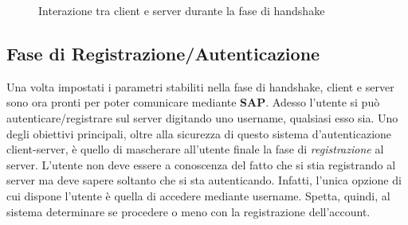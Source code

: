 \begin{figure}[!ht]
\centering
    \caption{Interazione tra client e server durante la fase di handshake}
    \label{fig:handshake}
    \end{figure}

\noindent\hrulefill

\newpage

\subsection{Fase di Registrazione/Autenticazione}

Una volta impostati i parametri stabiliti nella fase di handshake, client e server sono ora pronti per poter comunicare mediante \textbf{SAP}. Adesso l'utente si può autenticare/registrare sul server digitando uno username, qualsiasi esso sia. Uno degli obiettivi principali, oltre alla sicurezza di questo sistema d'autenticazione client-server, è quello di mascherare all'utente finale la fase di \textit{registrazione} al server. L'utente non deve essere a conoscenza del fatto che si stia registrando al server ma deve sapere soltanto che si sta autenticando. Infatti, l'unica opzione di cui dispone l'utente è quella di accedere mediante username. Spetta, quindi, al sistema determinare se procedere o meno con la registrazione dell'account. 

